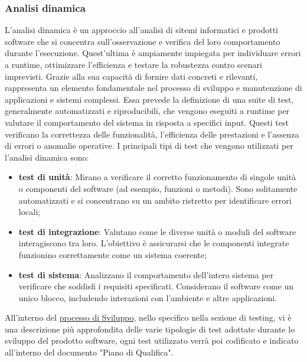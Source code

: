 \subsubsection{Analisi dinamica}
L'analisi dinamica è un approccio all'analisi di sitemi informatici e prodotti software che si concentra sull'osservazione e verifica
del loro comportamento durante l'esecuzione.
Quest'ultima è ampiamente impiegata per individuare errori a runtime, ottimizzare l'efficienza e testare la robustezza contro scenari imprevisti.
Grazie alla sua capacità di fornire dati concreti e rilevanti, rappresenta un elemento fondamentale nel processo di sviluppo e manutenzione di applicazioni e sistemi complessi.
Essa prevede la definizione di una suite di test, generalmente automatizzati e riproducibili, che vengono eseguiti a runtime per valutare il comportamento del sistema in risposta a specifici input. 
Questi test verificano la correttezza delle funzionalità, l'efficienza delle prestazioni e l'assenza di errori o anomalie operative.
I principali tipi di test che vengono utilizzati per l'analisi dinamica sono: 
\begin{itemize}
    \item \textbf{test di unità}: Mirano a verificare il corretto funzionamento di singole unità o componenti del software (ad esempio, funzioni o metodi). 
    Sono solitamente automatizzati e si concentrano su un ambito ristretto per identificare errori locali;
    \item \textbf{test di integrazione}: Valutano come le diverse unità o moduli del software interagiscono tra loro. 
    L'obiettivo è assicurarsi che le componenti integrate funzionino correttamente come un sistema coerente;
    \item \textbf{test di sistema}: Analizzano il comportamento dell'intero sistema per verificare che soddisfi i requisiti specificati. 
    Considerano il software come un unico blocco, includendo interazioni con l'ambiente e altre applicazioni.
\end{itemize}
All'interno del \hyperref[subsection:processo_sviluppo]{processo di Sviluppo}, nello specifico nella sezione di testing, vi è una descrizione 
più approfondita delle varie tipologie di test adottate durante lo sviluppo del prodotto software, ogni test utilizzato verrà poi 
codificato e indicato all'interno del documento "Piano di Qualifica".
